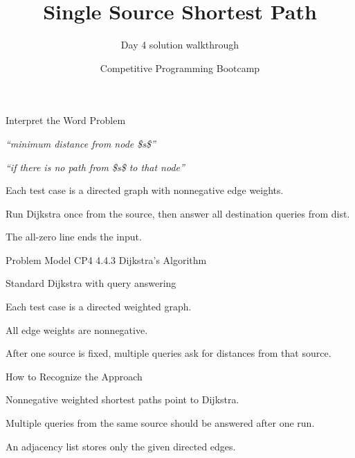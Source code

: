 \documentclass[aspectratio=169,11pt]{beamer}
\title[shortestpath1]{Single Source Shortest Path}
\subtitle{Day 4 solution walkthrough}
\author[Solution Deck]{Competitive Programming Bootcamp}
\date{}
\begin{document}
\begin{frame}[plain]
  \titlepage
\end{frame}

\begin{frame}{Interpret the Word Problem}
\small
{}
\begin{tightitemize}
  \item \textit{``minimum distance from node \$s\$''}
  \item \textit{``if there is no path from \$s\$ to that node''}
\end{tightitemize}

\vspace{0.18cm}
\begin{tightitemize}
  \item Each test case is a directed graph with nonnegative edge weights.
  \item Run Dijkstra once from the source, then answer all destination queries from dist.
  \item The all-zero line ends the input.
\end{tightitemize}
\end{frame}







\begin{frame}{Problem Model}
\small
{} CP4 4.4.3 Dijkstra's Algorithm

\vspace{0.25cm}
 Standard Dijkstra with query answering

\vspace{0.25cm}
\begin{tightitemize}
  \item Each test case is a directed weighted graph.
  \item All edge weights are nonnegative.
  \item After one source is fixed, multiple queries ask for distances from that source.
\end{tightitemize}
\end{frame}

\begin{frame}{How to Recognize the Approach}
\begin{tightitemize}
  \item Nonnegative weighted shortest paths point to Dijkstra.
  \item Multiple queries from the same source should be answered after one run.
  \item An adjacency list stores only the given directed edges.
\end{tightitemize}
\end{frame}
\end{document}
